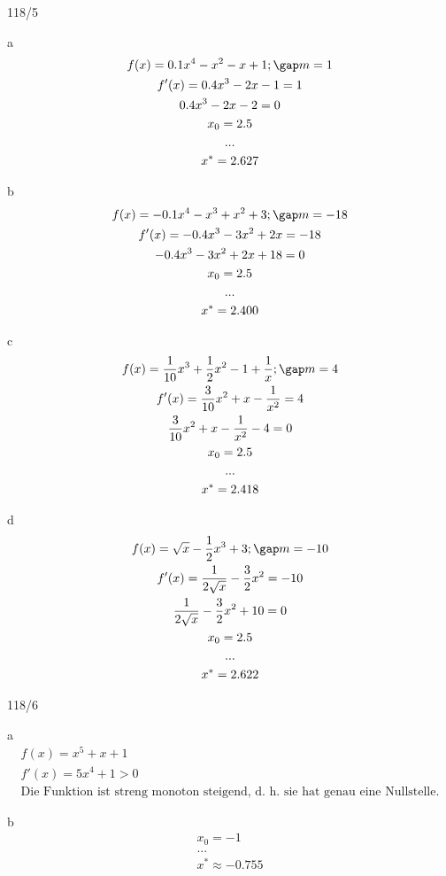 \begin{exercise}{118/5}
  \item [a]
  \begin{gather*}
    f(x) = 0.1x^4 - x^2 - x + 1; \gap m = 1 \\
    f'(x) = 0.4x^3 - 2x - 1 = 1 \\
    0.4x^3 - 2x - 2 = 0 \\
    x_0 = 2.5 \\
    ... \\
    x^\ast = 2.627
  \end{gather*}
  \item [b]
  \begin{gather*}
    f(x) = -0.1x^4 - x^3 + x^2 + 3; \gap m = -18 \\
    f'(x) = -0.4x^3 - 3x^2 + 2x = -18 \\
    -0.4x^3 - 3x^2 + 2x + 18 = 0 \\
    x_0 = 2.5 \\
    ... \\
    x^\ast = 2.400
  \end{gather*}
  \item [c]
  \begin{gather*}
    f(x) = \frac{1}{10}x^3 + \frac{1}{2}x^2 - 1 + \frac{1}{x}; \gap m = 4 \\
    f'(x) = \frac{3}{10}x^2 + x - \frac{1}{x^2} = 4 \\
    \frac{3}{10}x^2 + x - \frac{1}{x^2} - 4 = 0 \\
    x_0 = 2.5 \\
    ... \\
    x^\ast = 2.418
  \end{gather*}
  \item [d]
  \begin{gather*}
    f(x) = \sqrt{x} - \frac{1}{2}x^3 + 3; \gap m = -10 \\
    f'(x) = \frac{1}{2 \sqrt{x}} - \frac{3}{2}x^2 = -10 \\
    \frac{1}{2 \sqrt{x}} - \frac{3}{2}x^2 + 10 = 0 \\
    x_0 = 2.5 \\
    ... \\
    x^\ast = 2.622
  \end{gather*}
\end{exercise}
\begin{exercise}{118/6}
  \item [a]
  \begin{gather*}
    f(x) = x^5 + x + 1 \\
    f'(x) = 5x^4 + 1 > 0 \\
    \text{Die Funktion ist streng monoton steigend, d. h. sie hat genau eine Nullstelle.}
  \end{gather*}
  \item [b]
  \begin{gather*}
    x_0 = -1 \\
    ... \\
    x^\ast \approx -0.755
  \end{gather*}
\end{exercise}
